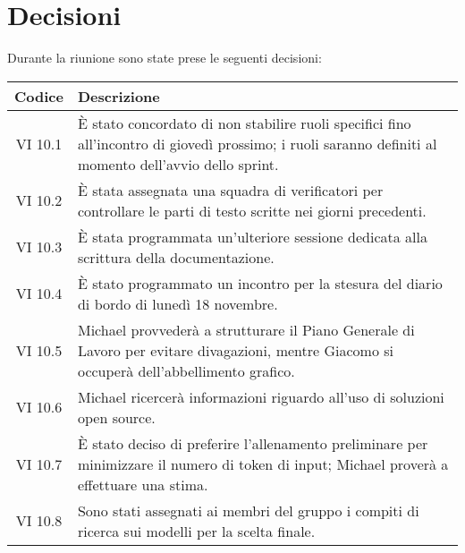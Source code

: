
\section{Decisioni}

Durante la riunione sono state prese le seguenti decisioni:

\vspace{0.5cm}

\begin{table}[htbp]
    \centering
    \begin{tabular}{|c|p{}|}
        \hline
        \rowcolor[gray]{0.75}
        \textbf{Codice} & \textbf{Descrizione}\\
        \hline
        VI 10.1 & È stato concordato di non stabilire ruoli specifici fino all'incontro di giovedì prossimo; i ruoli saranno definiti al momento dell'avvio dello sprint.\\
        \hline
        VI 10.2 & È stata assegnata una squadra di verificatori per controllare le parti di testo scritte nei giorni precedenti.\\
        \hline
        VI 10.3 & È stata programmata un'ulteriore sessione dedicata alla scrittura della documentazione.\\
        \hline
        VI 10.4 & È stato programmato un incontro per la stesura del diario di bordo di lunedì 18 novembre.\\
        \hline
        VI 10.5 & Michael provvederà a strutturare il Piano Generale di Lavoro per evitare divagazioni, mentre Giacomo si occuperà dell'abbellimento grafico.\\
        \hline
        VI 10.6 & Michael ricercerà informazioni riguardo all'uso di soluzioni open source.\\
        \hline
        VI 10.7 & È stato deciso di preferire l'allenamento preliminare per minimizzare il numero di token di input; Michael proverà a effettuare una stima.\\
        \hline
        VI 10.8 & Sono stati assegnati ai membri del gruppo i compiti di ricerca sui modelli per la scelta finale.\\
        \hline
    \end{tabular}
\end{table}
